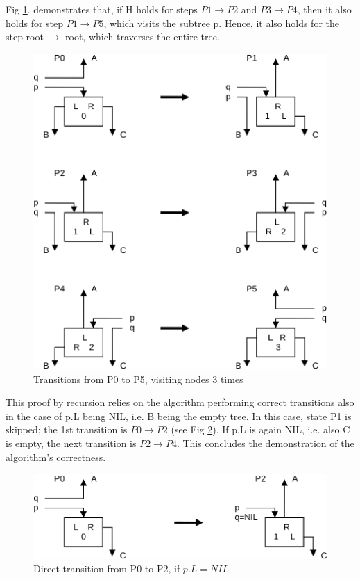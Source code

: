 Fig \ref{fig:transition-3-times}. demonstrates that, if H holds for steps $P1 \rightarrow P2$
and $P3 \rightarrow P4$, then it also holds for step $P1 \rightarrow P5$, which visits the
subtree p. Hence, it also holds for the step root $\rightarrow$ root, which traverses the entire tree.
\begin{figure}[h!]
  \label{fig:transition-3-times}
  \centering
  \includegraphics[width=.9\textwidth]{i/v}
  \caption{Transitions from P0 to P5, visiting nodes 3 times}
\end{figure}

This proof by recursion relies on the algorithm performing correct transitions also in the
case of p.L being NIL, i.e. B being the empty tree. In this case, state P1 is skipped; the
1st transition is $P0 \rightarrow P2$ (see Fig \ref{fig:transition-direct}).
If p.L is again NIL, i.e. also C is empty, the next transition is $P2 \rightarrow P4$.
This concludes the demonstration of the algorithm's correctness.
\begin{figure}[h!]
  \label{fig:transition-direct}
  \centering
  \includegraphics[width=\textwidth]{i/w}
  \caption{Direct transition from P0 to P2, if $p.L = NIL$}
\end{figure}

